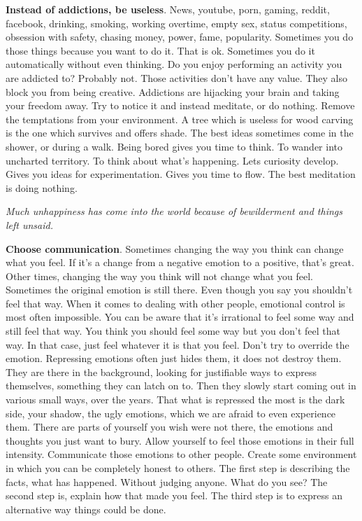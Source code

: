 \documentclass[a4paper,hidelinks]{article}
\begin{document}
\textbf{Instead of addictions, be useless}.
News, youtube, porn, gaming, reddit, facebook, drinking, smoking, working overtime, empty sex, status competitions, obsession with safety, chasing money, power, fame, popularity.
Sometimes you do those things because you want to do it.
That is ok.
Sometimes you do it automatically without even thinking.
Do you enjoy performing an activity you are addicted to?
Probably not.
Those activities don't have any value.
They also block you from being creative.
Addictions are hijacking your brain and taking your freedom away.
Try to notice it and instead meditate, or do nothing.
Remove the temptations from your environment.
A tree which is useless for wood carving is the one which survives and offers shade.
The best ideas sometimes come in the shower, or during a walk.
Being bored gives you time to think.
To wander into uncharted territory.
To think about what's happening.
Lets curiosity develop.
Gives you ideas for experimentation.
Gives you time to flow.
The best meditation is doing nothing.

\newpage

\begin{center}
\textit{Much unhappiness has come into the world because of bewilderment and things left unsaid.}
\end{center}

\textbf{Choose communication}.
Sometimes changing the way you think can change what you feel.
If it's a change from a negative emotion to a positive, that's great.
Other times, changing the way you think will not change what you feel.
Sometimes the original emotion is still there.
Even though you say you shouldn't feel that way.
When it comes to dealing with other people, emotional control is most often impossible.
You can be aware that it's irrational to feel some way and still feel that way.
You think you should feel some way but you don't feel that way.
In that case, just feel whatever it is that you feel.
Don't try to override the emotion.
Repressing emotions often just hides them, it does not destroy them.
They are there in the background, looking for justifiable ways to express themselves, something they can latch on to.
Then they slowly start coming out in various small ways, over the years.
That what is repressed the most is the dark side, your shadow, the ugly emotions, which we are afraid to even experience them.
There are parts of yourself you wish were not there, the emotions and thoughts you just want to bury.
Allow yourself to feel those emotions in their full intensity.
Communicate those emotions to other people.
Create some environment in which you can be completely honest to others.
The first step is describing the facts, what has happened.
Without judging anyone.
What do you see?
The second step is, explain how that made you feel.
The third step is to express an alternative way things could be done.
\end{document}
